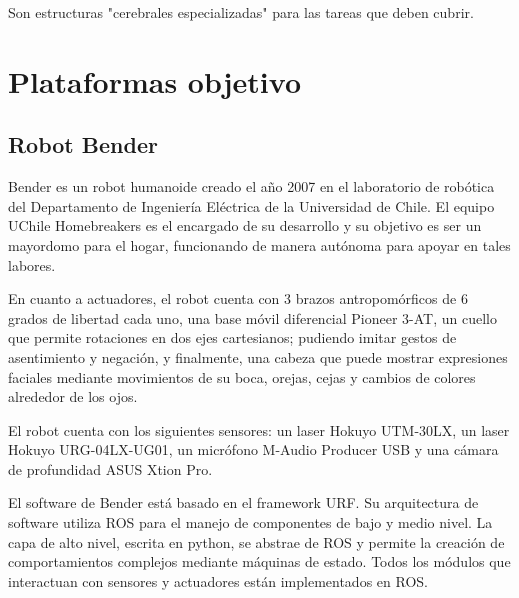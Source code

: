 Son estructuras "cerebrales especializadas" para las tareas que deben cubrir.




\section{Plataformas objetivo}

\subsection{Robot Bender}

Bender es un robot humanoide creado el a\~no 2007 en el laboratorio de rob\'otica del Departamento de Ingenier\'ia El\'ectrica de la Universidad de Chile. El equipo UChile Homebreakers es el encargado de su desarrollo y  su objetivo es ser un mayordomo para el hogar, funcionando de manera aut\'onoma para apoyar en tales labores\cite{uchile-robotics}.


En cuanto a actuadores, el robot cuenta con 3 brazos antropom\'orficos de 6 grados de libertad cada uno, una base m\'ovil diferencial Pioneer 3-AT, un cuello que permite rotaciones en dos ejes cartesianos; pudiendo imitar gestos de asentimiento y negaci\'on, y finalmente, una cabeza que puede mostrar expresiones faciales mediante movimientos de su boca, orejas, cejas y cambios de colores alrededor de los ojos.

El robot cuenta con los siguientes sensores: un laser Hokuyo UTM-30LX, un laser Hokuyo URG-04LX-UG01, un micr\'ofono M-Audio Producer USB y una c\'amara de profundidad ASUS Xtion Pro.

El software de Bender est\'a basado en el framework URF. Su arquitectura de software utiliza  ROS para el manejo de componentes de bajo y medio nivel. La capa de alto nivel, escrita en python, se abstrae de ROS y permite la creaci\'on de comportamientos complejos mediante m\'aquinas de estado. Todos los m\'odulos que interactuan con sensores y actuadores est\'an implementados en ROS.


%





